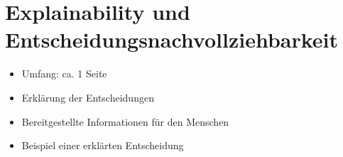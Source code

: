 \section{Explainability und Entscheidungsnachvollziehbarkeit}
\begin{itemize}
    \item Umfang: ca. 1 Seite
    \item Erklärung der Entscheidungen
    \item Bereitgestellte Informationen für den Menschen
    \item Beispiel einer erklärten Entscheidung
\end{itemize}